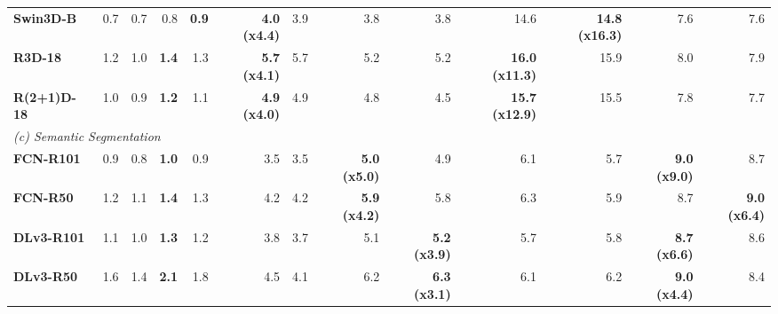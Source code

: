 \begin{table}[t]
{\begin{tabular}{lrrrrrrrrrrrr}
\textbf{Swin3D-B} & 0.7 & 0.7 & 0.8 & \cellcolor{green!15}\textbf{0.9} & \cellcolor{green!15}\textbf{4.0} \textbf{(x4.4)} & 3.9 & 3.8 & 3.8 & 14.6 & \cellcolor{green!15}\textbf{14.8} \textbf{(x16.3)} & 7.6 & 7.6 \\
\textbf{R3D-18} & 1.2 & 1.0 & \cellcolor{green!15}\textbf{1.4} & 1.3 & \cellcolor{green!15}\textbf{5.7} \textbf{(x4.1)} & 5.7 & 5.2 & 5.2 & \cellcolor{green!15}\textbf{16.0} \textbf{(x11.3)} & 15.9 & 8.0 & 7.9 \\
\textbf{R(2+1)D-18} & 1.0 & 0.9 & \cellcolor{green!15}\textbf{1.2} & 1.1 & \cellcolor{green!15}\textbf{4.9} \textbf{(x4.0)} & 4.9 & 4.8 & 4.5 & \cellcolor{green!15}\textbf{15.7} \textbf{(x12.9)} & 15.5 & 7.8 & 7.7 \\
\midrule
\multicolumn{13}{l}{\textit{(c) Semantic Segmentation}} \\
\midrule
\textbf{FCN-R101} & 0.9 & 0.8 & \cellcolor{green!15}\textbf{1.0} & 0.9 & 3.5 & 3.5 & \cellcolor{green!15}\textbf{5.0} \textbf{(x5.0)} & 4.9 & 6.1 & 5.7 & \cellcolor{green!15}\textbf{9.0} \textbf{(x9.0)} & 8.7 \\
\textbf{FCN-R50} & 1.2 & 1.1 & \cellcolor{green!15}\textbf{1.4} & 1.3 & 4.2 & 4.2 & \cellcolor{green!15}\textbf{5.9} \textbf{(x4.2)} & 5.8 & 6.3 & 5.9 & 8.7 & \cellcolor{green!15}\textbf{9.0} \textbf{(x6.4)} \\
\textbf{DLv3-R101} & 1.1 & 1.0 & \cellcolor{green!15}\textbf{1.3} & 1.2 & 3.8 & 3.7 & 5.1 & \cellcolor{green!15}\textbf{5.2} \textbf{(x3.9)} & 5.7 & 5.8 & \cellcolor{green!15}\textbf{8.7} \textbf{(x6.6)} & 8.6 \\
\textbf{DLv3-R50} & 1.6 & 1.4 & \cellcolor{green!15}\textbf{2.1} & 1.8 & 4.5 & 4.1 & 6.2 & \cellcolor{green!15}\textbf{6.3} \textbf{(x3.1)} & 6.1 & 6.2 & \cellcolor{green!15}\textbf{9.0} \textbf{(x4.4)} & 8.4 \\
\bottomrule
\end{tabular}%
}
\end{table}

